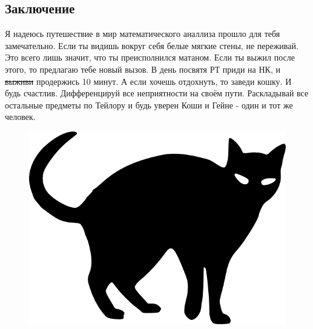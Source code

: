 \clearpage

\begin{center}
	\section*{Заключение}	
\end{center}
Я надеюсь путешествие в мир математического аналлиза прошло для тебя замечательно.
Если ты видишь вокруг себя белые мягкие стены, не переживай. Это всего лишь значит, что ты преисполнился матаном. Если ты выжил после этого, то предлагаю тебе новый вызов. В день посвятя РТ приди на НК, и \sout{выживи} продержись 10 минут. А если хочешь отдохнуть, то заведи кошку. И будь счастлив. Дифференцируй все неприятности на своём пути. Раскладывай все остальные предметы по Тейлору и будь уверен Коши и Гейне - один и тот же человек.
\vspace{100pt}
\begin{figure}[h]
	\centering
\includegraphics[scale=0.7]{cat}	
\end{figure}


